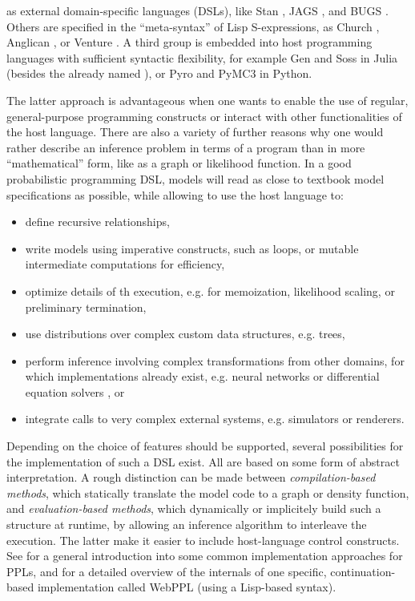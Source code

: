  as external domain-specific languages (DSLs), like Stan
\parencite{carpenter2017stan}, JAGS \parencite{plummer2003jags}, and BUGS
\parencite{lunn2000winbugs,lunn2009bugs}.  Others are specified in the \enquote{meta-syntax} of Lisp
S-expressions, as Church \parencite{goodman2012church}, Anglican \parencite{wood2015new}, or Venture
\parencite{mansinghka2014venture}.  A third group is embedded into host programming languages with
sufficient syntactic flexibility, for example Gen \parencite{cusumano-towner2020gen} and Soss
\parencite{scherrer2019soss} in Julia (besides the already named \turingjl{}), or Pyro
\parencite{bingham2018pyro} and PyMC3 \parencite{salvatier2016probabilistic} in Python.

The latter approach is advantageous when one wants to enable the use of regular, general-purpose
programming constructs or interact with other functionalities of the host language.  There are also
a variety of further reasons why one would rather describe an inference problem in terms of a
program than in more \enquote{mathematical} form, like as a graph or likelihood function.  In a good
probabilistic programming DSL, models will read as close to textbook model specifications as
possible, while allowing to use the host language to:
\begin{itemize}
\item define recursive relationships,
\item write models using imperative constructs, such as loops, or mutable intermediate computations
  for efficiency,
\item optimize details of th execution, e.g. for memoization, likelihood scaling, or preliminary
  termination,
\item use distributions over complex custom data structures, e.g. trees,
\item perform inference involving complex transformations from other domains, for which
  implementations already exist, e.g. neural networks or differential equation solvers , or
\item integrate calls to very complex external systems, e.g. simulators or renderers.
\end{itemize}
Depending on the choice of features should be supported, several possibilities for the
implementation of such a DSL exist.  All are based on some form of abstract interpretation.  A rough
distinction can be made between \emph{compilation-based methods}, which statically translate the
model code to a graph or density function, and \emph{evaluation-based methods}, which dynamically or
implicitely build such a structure at runtime, by allowing an inference algorithm to interleave the
execution.  The latter make it easier to include host-language control constructs.  See
\textcite{vandemeent2018introduction} for a general introduction into some common implementation
approaches for PPLs, and \textcite{goodman2014design} for a detailed overview of the internals of
one specific, continuation-based implementation called WebPPL (using a Lisp-based syntax).

